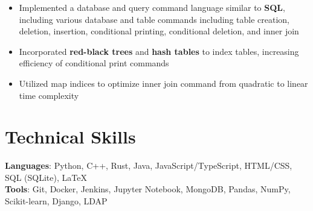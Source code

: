 \documentclass[letterpaper,11pt]{article}
\begin{document}
\begin{itemize}
    \item Implemented a database and query command language similar to \textbf{SQL},
          including various database and table commands including table creation,
          deletion, insertion, conditional printing, conditional deletion, and inner join
    \item Incorporated \textbf{red-black trees} and \textbf{hash tables} to index tables,
          increasing efficiency of conditional print commands
    \item Utilized map indices to optimize inner join command from quadratic to linear
          time complexity
\end{itemize}
\section{Technical Skills}
\textbf{Languages}: Python, C++, Rust, Java, JavaScript/TypeScript, HTML/CSS,
SQL (SQLite), \LaTeX \\
\textbf{Tools}: Git, Docker, Jenkins, Jupyter Notebook,
MongoDB, Pandas, NumPy, Scikit-learn, Django, LDAP
\end{document}
